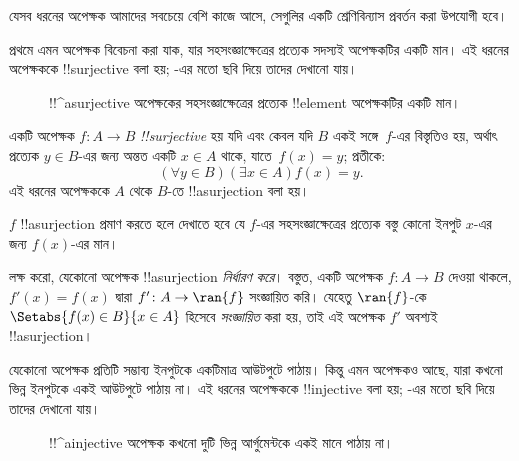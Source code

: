 \documentclass[../../../include/open-logic-section]{subfiles}
\begin{document}

\begin{explain}
যেসব ধরনের অপেক্ষক আমাদের সবচেয়ে বেশি কাজে আসে, সেগুলির একটি শ্রেণিবিন্যাস প্রবর্তন করা উপযোগী হবে।

প্রথমে এমন অপেক্ষক বিবেচনা করা যাক, যার সহসংজ্ঞাক্ষেত্রের প্রত্যেক সদস্যই অপেক্ষকটির একটি মান। এই ধরনের অপেক্ষককে !!{surjective} বলা হয়; -এর মতো ছবি দিয়ে তাদের দেখানো যায়।

\begin{figure}
  \caption{!!^a{surjective} অপেক্ষকের সহসংজ্ঞাক্ষেত্রের প্রত্যেক !!{element} অপেক্ষকটির একটি মান।}
\end{figure}
\end{explain}

\begin{defn}[!!^{surjective} অপেক্ষক]
একটি অপেক্ষক $f \colon A \rightarrow B$ \emph{!!{surjective}} হয় যদি এবং কেবল যদি $B$ একই সঙ্গে~$f$-এর বিস্তৃতিও হয়, অর্থাৎ প্রত্যেক $y \in B$-এর জন্য অন্তত একটি $x \in A$ থাকে, যাতে~$f(x) = y$; প্রতীকে:
\[
  (\forall y \in B)(\exists x \in A)f(x) = y.
\]
এই ধরনের অপেক্ষককে $A$ থেকে $B$-তে !!a{surjection} বলা হয়।
\end{defn}

\begin{explain}
$f$ !!a{surjection} প্রমাণ করতে হলে দেখাতে হবে যে $f$-এর সহসংজ্ঞাক্ষেত্রের প্রত্যেক বস্তু কোনো ইনপুট $x$-এর জন্য $f(x)$-এর মান।

লক্ষ করো, যেকোনো অপেক্ষক !!a{surjection} \emph{নির্ধারণ করে}। বস্তুত, একটি অপেক্ষক $f \colon A \to B$ দেওয়া থাকলে, $f'(x) = f(x)$ দ্বারা $f' \colon A \to \ran{f}$ সংজ্ঞায়িত করি। যেহেতু $\ran{f}$-কে $\Setabs{f(x) \in B}{x \in A}$ হিসেবে \emph{সংজ্ঞায়িত} করা হয়, তাই এই অপেক্ষক $f'$ অবশ্যই !!a{surjection}।
\end{explain}

\begin{explain}
যেকোনো অপেক্ষক প্রতিটি সম্ভাব্য ইনপুটকে একটিমাত্র আউটপুটে পাঠায়। কিন্তু এমন অপেক্ষকও আছে, যারা কখনো ভিন্ন ইনপুটকে একই আউটপুটে পাঠায় না। এই ধরনের অপেক্ষককে !!{injective} বলা হয়; -এর মতো ছবি দিয়ে তাদের দেখানো যায়।
\begin{figure}
  \caption{!!^a{injective} অপেক্ষক কখনো দুটি ভিন্ন আর্গুমেন্টকে একই মানে পাঠায় না।}
\end{figure}
\end{explain}
\end{document}
